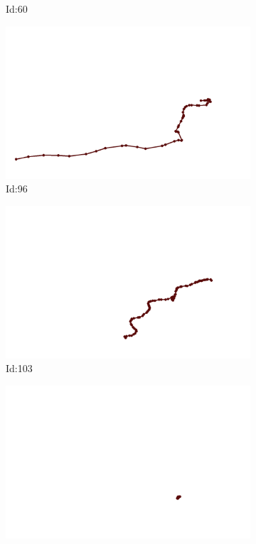 \documentclass[12pt,twoside]{report}
\begin{document}
\begin{figure}
\begin{subfigure}[b]{0.20\textwidth}
\caption{Id:60}
\end{subfigure}
\begin{subfigure}[b]{0.20\textwidth}
\centering
\includegraphics[width=\textwidth]{../trajectories/96.png}
\caption{Id:96}
\end{subfigure}
\begin{subfigure}[b]{0.20\textwidth}
\centering
\includegraphics[width=\textwidth]{../trajectories/103.png}
\caption{Id:103}
\end{subfigure}
\begin{subfigure}[b]{0.20\textwidth}
\centering
\includegraphics[width=\textwidth]{../trajectories/159.png}

\end{subfigure}
\end{figure}
\end{document}
